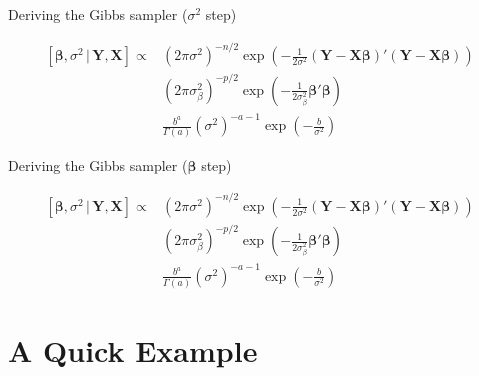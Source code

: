 \documentclass[11pt,ignorenonframetext,]{beamer}
\begin{document}
\begin{frame}[t]{Deriving the Gibbs sampler (\(\sigma^2\) step)}
\protect\hypertarget{deriving-the-gibbs-sampler-sigma2-step}{}

\scriptsize

\[
\begin{aligned}
\left[ \symbf{\beta}, \sigma^2 \,|\, \symbf{Y}, \symbf{X}  \right]  \propto
  &\left(2\pi \sigma^2\right)^{-n/2} \exp\left( -\frac{1}{2\sigma^2} (\symbf{Y}-\symbf{X}\symbf{\beta})'(\symbf{Y}-\symbf{X}\symbf{\beta}) \right) \\
  &(2\pi \sigma^2_\beta)^{-p/2} \exp\left( -\frac{1}{2\sigma^2_\beta} \symbf{\beta}'\symbf{\beta} \right) \\
  &\frac{b^a}{\Gamma(a)} (\sigma^2)^{-a-1} \exp\left( -\frac{b}{\sigma^2} \right) 
\end{aligned}
\]

\end{frame}

\begin{frame}[plain]{}
\protect\hypertarget{section}{}

\end{frame}

\begin{frame}[t]{Deriving the Gibbs sampler (\(\symbf{\beta}\) step)}
\protect\hypertarget{deriving-the-gibbs-sampler-symbfbeta-step}{}

\scriptsize

\[
\begin{aligned}
\left[ \symbf{\beta}, \sigma^2 \,|\, \symbf{Y}, \symbf{X}  \right]  \propto
  &\left(2\pi \sigma^2\right)^{-n/2} \exp\left( -\frac{1}{2\sigma^2} (\symbf{Y}-\symbf{X}\symbf{\beta})'(\symbf{Y}-\symbf{X}\symbf{\beta}) \right) \\
  &(2\pi \sigma^2_\beta)^{-p/2} \exp\left( -\frac{1}{2\sigma^2_\beta} \symbf{\beta}'\symbf{\beta} \right) \\
  &\frac{b^a}{\Gamma(a)} (\sigma^2)^{-a-1} \exp\left( -\frac{b}{\sigma^2} \right) 
\end{aligned}
\]

\end{frame}

\begin{frame}[plain]{}
\protect\hypertarget{section-1}{}

\end{frame}

\hypertarget{a-quick-example}{%
\section{A Quick Example}\label{a-quick-example}}
\end{document}
